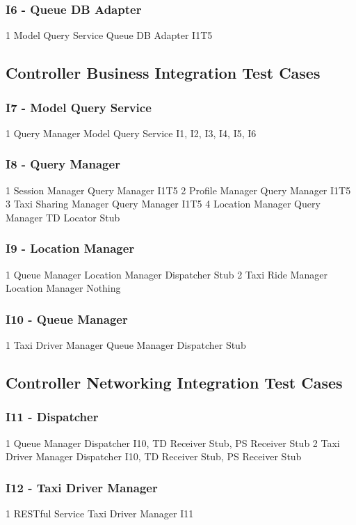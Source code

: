 \subsubsection{I6 - Queue DB Adapter}
\testCaseSimpleSimple
	{1}
	{Model Query Service}
	{Queue DB Adapter}
	{I1T5}
\subsection{Controller Business Integration Test Cases}
\subsubsection{I7 - Model Query Service}
\testCaseSimpleSimple
	{1}
	{Query Manager}
	{Model Query Service}
	{I1, I2, I3, I4, I5, I6}
\subsubsection{I8 - Query Manager}
\testCaseSimpleSimple
	{1}
	{Session Manager}
	{Query Manager}
	{I1T5}
\testCaseSimpleSimple
	{2}
	{Profile Manager}
	{Query Manager}
	{I1T5}
\testCaseSimpleSimple
	{3}
	{Taxi Sharing Manager}
	{Query Manager}
	{I1T5}
\testCaseSimpleSimple
	{4}
	{Location Manager}
	{Query Manager}
	{TD Locator Stub}
\subsubsection{I9 - Location Manager}
\testCaseSimpleSimple
	{1}
	{Queue Manager}
	{Location Manager}
	{Dispatcher Stub}
\testCaseSimpleSimple
	{2}
	{Taxi Ride Manager}
	{Location Manager}
	{Nothing}
\subsubsection{I10 - Queue Manager}
\testCaseSimpleSimple
	{1}
	{Taxi Driver Manager}
	{Queue Manager}
	{Dispatcher Stub}
\subsection{Controller Networking Integration Test Cases}
\subsubsection{I11 - Dispatcher}
\testCaseSimpleSimple
	{1}
	{Queue Manager}
	{Dispatcher}
	{I10, TD Receiver Stub, PS Receiver Stub}
\testCaseSimpleSimple
	{2}
	{Taxi Driver Manager}
	{Dispatcher}
	{I10, TD Receiver Stub, PS Receiver Stub}
\subsubsection{I12 - Taxi Driver Manager}
\testCaseSimpleSimple
	{1}
	{RESTful Service}
	{Taxi Driver Manager}
	{I11}
